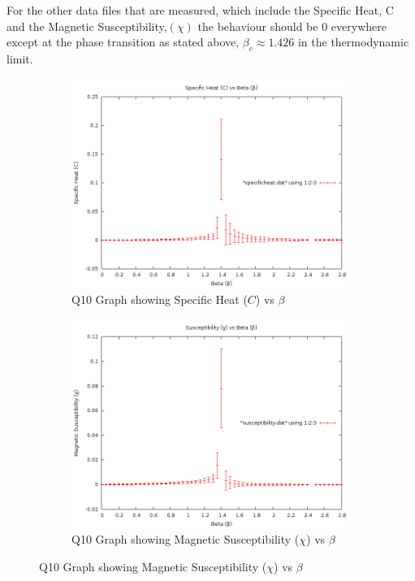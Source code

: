 For the other data files that are measured, which include the Specific Heat, C and the Magnetic Susceptibility,$(\chi)$ the behaviour should be 0 everywhere except at the phase transition as stated above, $\beta_c \approx 1.426$ in the thermodynamic limit.

\begin{figure}[H]
\centering
\begin{subfigure}[b]{0.45\textwidth}
    \includegraphics[width=\textwidth]{4-Results/Q10SpecificHeatBeta16x16RangeofBeta.png}
    \caption{Q10 Graph showing Specific Heat ($C$) vs $\beta$}
\end{subfigure}
\begin{subfigure}[b]{0.45\textwidth}
    \includegraphics[width=\textwidth]{4-Results/Q10SusceptibilityBeta16x16RangeofBeta.png}
    \caption{Q10 Graph showing Magnetic Susceptibility ($\chi$) vs $\beta$}
\end{subfigure}
\end{figure}

